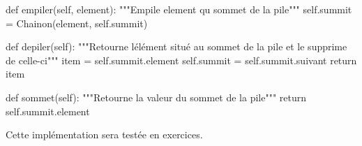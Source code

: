 \documentclass[
  letterpaper,
  DIV=11,
  numbers=noendperiod]{scrartcl}
\newenvironment{Shaded}{\begin{snugshade}}{\end{snugshade}}
\newcommand{\CommentTok}[1]{\textcolor[rgb]{0.37,0.37,0.37}{#1}}
\newcommand{\ControlFlowTok}[1]{\textcolor[rgb]{0.00,0.23,0.31}{#1}}
\newcommand{\KeywordTok}[1]{\textcolor[rgb]{0.00,0.23,0.31}{#1}}
\newcommand{\NormalTok}[1]{\textcolor[rgb]{0.00,0.23,0.31}{#1}}
\newcommand{\OperatorTok}[1]{\textcolor[rgb]{0.37,0.37,0.37}{#1}}
\newcommand{\VariableTok}[1]{\textcolor[rgb]{0.07,0.07,0.07}{#1}}
\begin{document}
\begin{Shaded}
\begin{Highlighting}[]
    \KeywordTok{def}\NormalTok{ empiler(}\VariableTok{self}\NormalTok{, element):}
        \CommentTok{"""Empile element qu sommet de la pile"""}
        \VariableTok{self}\NormalTok{.summit }\OperatorTok{=}\NormalTok{ Chainon(element, }\VariableTok{self}\NormalTok{.summit)}

    \KeywordTok{def}\NormalTok{ depiler(}\VariableTok{self}\NormalTok{):}
        \CommentTok{"""Retourne l\textquotesingle{}élément situé au sommet de la pile}
\CommentTok{        et le supprime de celle{-}ci"""}
\NormalTok{        item }\OperatorTok{=} \VariableTok{self}\NormalTok{.summit.element}
        \VariableTok{self}\NormalTok{.summit }\OperatorTok{=} \VariableTok{self}\NormalTok{.summit.suivant}
        \ControlFlowTok{return}\NormalTok{ item}

    \KeywordTok{def}\NormalTok{ sommet(}\VariableTok{self}\NormalTok{):}
        \CommentTok{"""Retourne la valeur du sommet de la pile"""}
        \ControlFlowTok{return} \VariableTok{self}\NormalTok{.summit.element}

\end{Highlighting}
\end{Shaded}

Cette implémentation sera testée en exercices.
\end{document}

